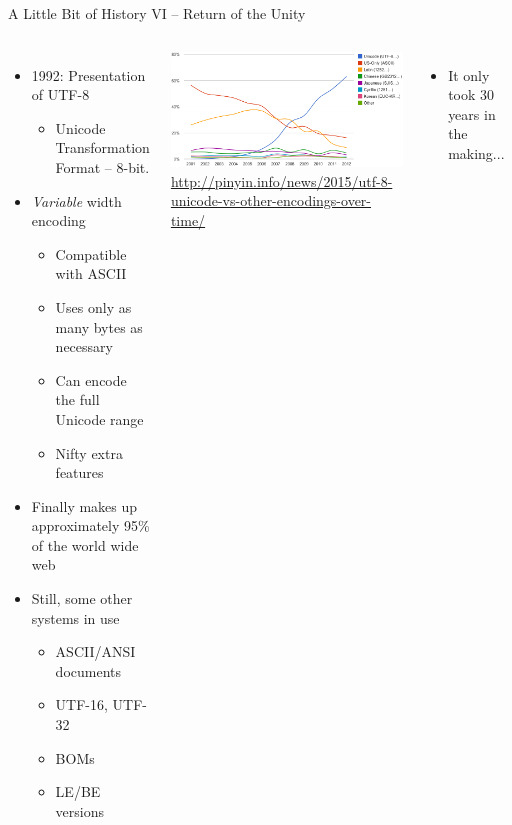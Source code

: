 \begin{frame}{A Little Bit of History VI -- Return of the Unity}
%
\begin{columns}
\begin{itemize}
\item 1992: Presentation of UTF-8
	\begin{itemize}
	\item Unicode Transformation Format -- 8-bit.
	\end{itemize}
\item \emph{Variable} width encoding
	\begin{itemize}
	\item Compatible with ASCII
	\item Uses only as many bytes as necessary
	\item Can encode the full Unicode range
	\item Nifty extra features
	\end{itemize}
\item Finally makes up approximately 95\% of the world wide web
\item Still, some other systems in use
	\begin{itemize}
	\item ASCII/ANSI documents
	\item UTF-16, UTF-32
	\item BOMs
	\item LE/BE versions
	\end{itemize}
\end{itemize}
%
\includegraphics[width=\linewidth]{./gfx/UTF-8-website-use-2001-2012}\\
{\tiny \url{http://pinyin.info/news/2015/utf-8-unicode-vs-other-encodings-over-time/}}
\begin{itemize}
\item[\Thus] It only took 30 years in the making...
\end{itemize}
\end{columns}
%
\end{frame}

